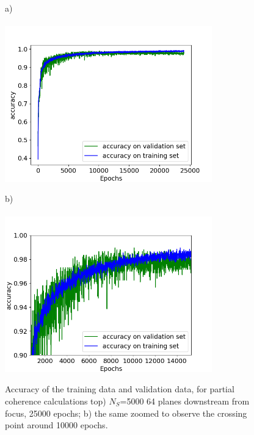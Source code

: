 \documentclass[preprint]{iucr}
\begin{document}
 
\begin{figure}\label{fig:multimode}
    a)~~~~~~~~~~~~~~~~~~~~~~~~~~~~~~~~~~~~~~~~~~~~~~~~~~~~~~~~~~~~~~~~~~~~~~~~~~~~~~~\\
    \includegraphics[width=0.8\textwidth]{figures/v23.png}
    
    b)~~~~~~~~~~~~~~~~~~~~~~~~~~~~~~~~~~~~~~~~~~~~~~~~~~~~~~~~~~~~~~~~~~~~~~~~~~~~~~~\\
    \includegraphics[width=0.8\textwidth]{figures/v23zoom.png}
    \caption{Accuracy of the training data and validation data, for partial coherence calculations top) $N_S$=5000 64 planes downstream from focus, 25000 epochs;
    b) the same zoomed to observe the crossing point around 10000 epochs.
    }
\end{figure}
\end{document}
